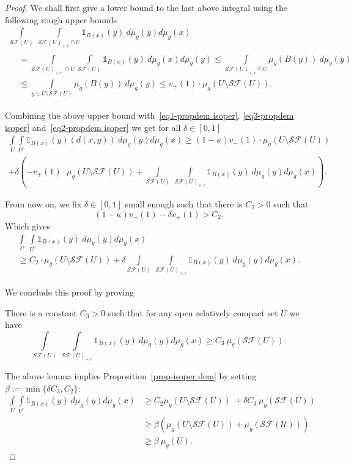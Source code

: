 \documentclass[AHL,Unicode,longabstracts,published]{cedram}
\newcommand{\dsun}{\mathds{1}}
\newcommand{\cSF}{\mathcal{SF}}
\newcommand{\inte}[1]{\underset{#1}{\int}}
\begin{document}
\begin{proof}
We shall first give a lower bound to the last above integral using the following rough upper bounds
\begin{multline*}
\inte{\cSF(U)} \ \inte{\cSF(U)_{+, \epsilon} \cap U} \dsun_{B(x)}(y) \ d \mu_g(y) d \mu_g(x)\\
\begin{aligned}
 & = \inte{\cSF(U)_{+, \epsilon} \ \cap U} \inte{\cSF(U)} \dsun_{B(x)}(y) \ d \mu_g(x) d \mu_g(y)  \le \inte{\cSF(U)_{+, \epsilon} \cap U} \mu_g(B(y)) \ d \mu_g(y) \\
& \le \inte{y \in U \setminus \cSF(U)} \mu_g(B(y)) \ d \mu_g(y)
 \le v_+(1) \cdot \mu_g\left(U \setminus \cSF(U)\right) .
\end{aligned}
\end{multline*}

Combining the above upper bound with~\eqref{eq1-propdem isoper}, \eqref{eq3-propdem isoper} and~\eqref{eq2-propdem isoper} we get for all $\delta \in [0, 1]$
\begin{multline*}
\inte{U} \inte{U^c} \dsun_{B(x)}(y) (d(x,y)) \ d \mu_g(y) d \mu_g(x) \ge (1- \kappa) v_-(1) \cdot \mu_g\left(U \setminus \cSF(U)\right) \\
+ \delta \left(- v_+(1) \cdot \mu_g(U \setminus \cSF(U)) + \inte{\cSF(U)} \ \inte{\cSF(U)_{+, \epsilon}} \dsun_{B(x)}(y) \ d \mu_g(y) d \mu_g(x) \right) .
\end{multline*}

From now on, we fix $\delta \in [0,1]$ small enough such that there is $C_2 > 0$ such that
\[
(1- \kappa) v_-(1) - \delta v_+(1) > C_2  .
\]
Which gives
\begin{multline*}
\inte{U} \ \inte{U^c} \dsun_{B(x)}(y) \ d \mu_g(y) d \mu_g(x)\\
\ge C_2 \cdot \mu_g(U \setminus \cSF(U)) + \delta \inte{ \cSF(U)} \ \inte{\cSF(U)_{+, \epsilon}} \dsun_{B(x)}(y) \ d \mu_g(y) d \mu_g(x)  .
\end{multline*}

We conclude this proof by proving
\begin{lemm}\label{lemme-propdem isoper}
There is a constant $C_3 > 0$ such that for any open relatively compact set $U$ we have
\[
\inte{\cSF(U)} \ \inte{ \cSF(U)_{+, \epsilon}} \dsun_{B(x)}(y) \ d \mu_g(y) d \mu_g(x) \ge C_3 \ \mu_g(\cSF(U)) .
\]
\end{lemm}

The above lemma implies Proposition~\ref{prop-isoper dem} by setting $\beta := \min \{ \delta C_3, C_2 \}$:
\begin{align*}
\inte{U} \inte{ U^c} \dsun_{B(x)}(y) \ d \mu_g(y) d \mu_g(x) & \ge C_2 \mu_g\left(U \setminus \cSF(U)\right) \ + \delta C_3 \ \mu_g(\cSF(U)) \\
& \ge \beta \left(\mu_g\left(U \setminus \cSF(U)\right) + \mu_g\left(\mathcal{\cSF(U)}\right)\right) \\
& \ge \beta \ \mu_g(U) .
\end{align*}



\end{proof}
\end{document}
